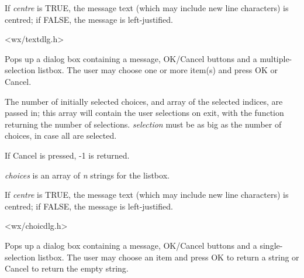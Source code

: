 If {\it centre} is TRUE, the message text (which may include new line characters)
is centred; if FALSE, the message is left-justified.


<wx/textdlg.h>

\label{wxgetmultiplechoice}


Pops up a dialog box containing a message, OK/Cancel buttons and a multiple-selection
listbox. The user may choose one or more item(s) and press OK or Cancel.

The number of initially selected choices, and array of the selected indices,
are passed in; this array will contain the user selections on exit, with
the function returning the number of selections. {\it selection} must be
as big as the number of choices, in case all are selected.

If Cancel is pressed, -1 is returned.

{\it choices} is an array of {\it n} strings for the listbox.

If {\it centre} is TRUE, the message text (which may include new line characters)
is centred; if FALSE, the message is left-justified.


<wx/choicdlg.h>

\label{wxgetsinglechoice}


Pops up a dialog box containing a message, OK/Cancel buttons and a single-selection
listbox. The user may choose an item and press OK to return a string or
Cancel to return the empty string.

